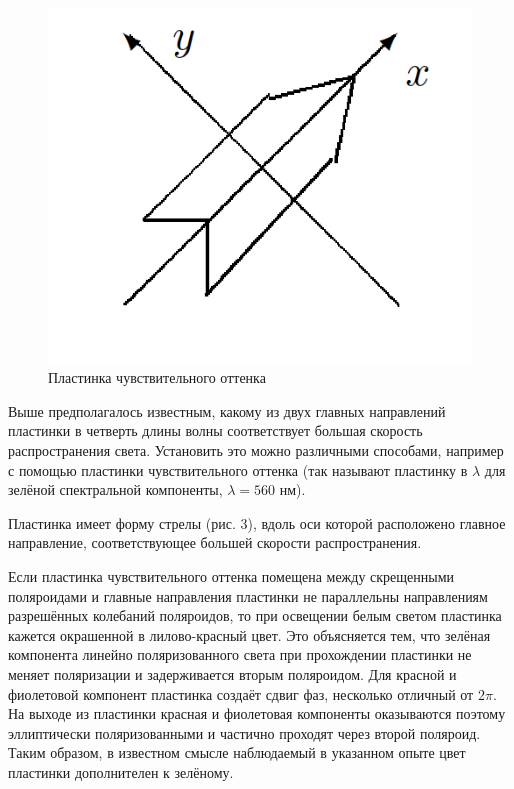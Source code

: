 \documentclass[a4paper,12pt]{article}
\begin{document}
\begin{figure}[h!]
    \centering
    \includegraphics[scale = 0.4]{3.png}
    \caption{Пластинка чувствительного оттенка}
    \label{fig : 1}
\end{figure}
Выше предполагалось известным, какому из двух главных направлений пластинки в четверть длины волны соответствует большая скорость распространения света.
Установить это можно различными способами, например с помощью
пластинки чувствительного оттенка (так называют пластинку в $ \lambda $
для зелёной спектральной компоненты, $ \lambda = 560 $ нм).

Пластинка имеет форму стрелы (рис. 3), вдоль оси которой расположено главное направление, соответствующее большей скорости распространения.

Если пластинка чувствительного оттенка помещена между скрещенными поляроидами и главные направления пластинки не параллельны
направлениям разрешённых колебаний поляроидов, то при освещении
белым светом пластинка кажется окрашенной в лилово-красный цвет.
Это объясняется тем, что зелёная компонента линейно поляризованного света при прохождении пластинки не меняет поляризации и задерживается вторым поляроидом. Для красной и фиолетовой компонент
пластинка создаёт сдвиг фаз, несколько отличный от $ 2\pi $. На выходе
из пластинки красная и фиолетовая компоненты оказываются поэтому
эллиптически поляризованными и частично проходят через второй поляроид. Таким образом, в известном смысле наблюдаемый в указанном
опыте цвет пластинки дополнителен к зелёному.
\end{document}
